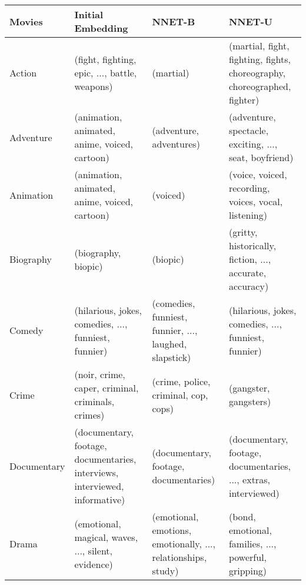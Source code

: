 \begin{landscape}
	
	\begin{table}[]
		\scriptsize
		\centering
		\setlength\extrarowheight{-0.5pt}
		
		\begin{tabular}{lp{7cm}p{7cm}p{7cm}}
			\textbf{Movies}      & Initial Embedding                                                       & NNET-B                                                           & NNET-U                                                           \\
			\toprule
			Action      & (fight, fighting, epic, ..., battle, weapons)                                & (martial)                                                          & (martial, fight, fighting, fights, choreography, choreographed, fighter) \\
			Adventure   & (animation, animated, anime, voiced, cartoon)                                & (adventure, adventures)                                            & (adventure, spectacle, exciting, ..., seat, boyfriend)                   \\
			Animation   & (animation, animated, anime, voiced, cartoon)                                & (voiced)                                                           & (voice, voiced, recording, voices, vocal, listening)                     \\
			Biography   & (biography, biopic)                                                          & (biopic)                                                           & (gritty, historically, fiction, ..., accurate, accuracy)                 \\
			Comedy      & (hilarious, jokes, comedies, ..., funniest, funnier)                         & (comedies, funniest, funnier, ..., laughed, slapstick)             & (hilarious, jokes, comedies, ..., funniest, funnier)                     \\
			Crime       & (noir, crime, caper, criminal, criminals, crimes)                            & (crime, police, criminal, cop, cops)                               & (gangster, gangsters)                                                    \\
			Documentary & (documentary, footage, documentaries, interviews, interviewed, informative)  & (documentary, footage, documentaries)                              & (documentary, footage, documentaries, ..., extras, interviewed)          \\
			Drama       & (emotional, magical, waves, ..., silent, evidence)                           & (emotional, emotions, emotionally, ..., relationships, study)      & (bond, emotional, families, ..., powerful, gripping)                     \\

\end{tabular}
\end{table}
\end{landscape}
